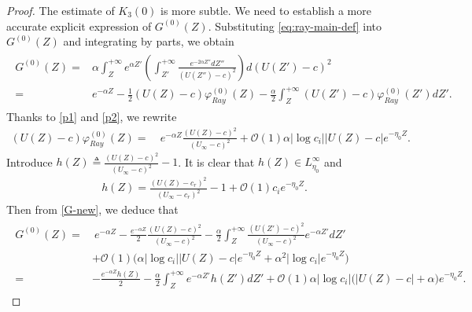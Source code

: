 \documentclass[10pt,a4paper]{amsart}
\begin{document}
\begin{proof}
		
The estimate of $K_3(0)$ is more subtle. We need to establish a more accurate explicit expression of $G^{(0)}(Z)$. Substituting \eqref{eq:ray-main-def} into $G^{(0)}(Z)$ and integrating by parts, we obtain
			\begin{align}\label{G-new}\begin{aligned}
					G^{(0)}(Z) =& \alpha\int_{Z}^{+\infty}e^{\alpha Z'}\left(\int_{Z'}^{+\infty}\frac{e^{-2\alpha Z''}d Z''}{(U(Z'')-c)^2}\right)d(U(Z')-c)^2\\
					=& e^{-\alpha Z}-\frac{1}{2}(U(Z)-c)\varphi_{Ray}^{(0)}(Z)
					-\frac{\alpha}{2}\int_{Z}^{+\infty}(U(Z')-c)\varphi_{Ray}^{(0)}(Z')dZ'.
			\end{aligned}\end{align}
			Thanks to \eqref{p1} and \eqref{p2}, we rewrite
			\begin{align*}
				(U(Z)-c)\varphi_{Ray}^{(0)}(Z)= &~ e^{-\alpha Z}\frac{(U(Z)-c)^2}{(U_\infty-c)^2}+\mathcal{O}(1)\alpha|\log c_i||U(Z)-c|e^{-\eta_0 Z}.
			\end{align*}
	Introduce $h(Z)\triangleq \frac{(U(Z)-c)^2}{(U_\infty-c)^2}-1$. It is clear that $h(Z) \in L^\infty_{\eta_0}$ and 
			\begin{align}\label{def-h}
			h(Z)= \frac{(U(Z)-c_r)^2}{(U_\infty-c_r)^2}-1+\mathcal{O}(1)c_ie^{-\eta_0 Z}.
			\end{align}
	Then from \eqref{G-new}, we deduce that
			\begin{align}\label{G-exp}\begin{aligned}
					G^{(0)}(Z)= &~e^{-\alpha Z}-\frac{e^{-\alpha Z}}{2}\frac{(U(Z)-c)^2}{(U_\infty-c)^2}-\frac{\alpha}{2}\int_{Z}^{+\infty}\frac{(U(Z')-c)^2}{(U_\infty-c)^2}e^{-\alpha Z'}dZ'\\
					&+\mathcal{O}(1)\big(\alpha|\log c_i||U(Z)-c|e^{-\eta_0 Z}+\alpha^2|\log c_i|e^{-\eta_0 Z}\big)\\
					=&-\frac{ e^{-\alpha Z}h(Z)}{2}-\frac{\alpha}{2}\int_{Z}^{+\infty}%
					e^{-\alpha Z'}h(Z')dZ'+\mathcal{O}(1)\alpha|\log c_i|\big(|U(Z)-c|+\alpha\big)e^{-\eta_0 Z}.

\end{aligned}
\end{align}
\end{proof}
\end{document}

